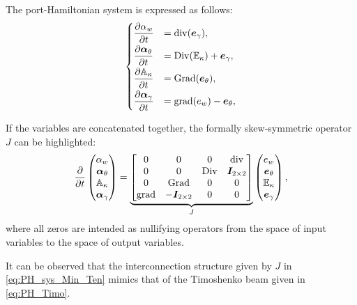 The port-Hamiltonian system is expressed as follows:
\begin{equation}
\begin{cases}
\displaystyle\diffp{\alpha_w}{t} &= \mathrm{div}(\bm{e}_{\gamma}), \vspace{1mm} \\
\displaystyle\diffp{\bm\alpha_\theta}{t} &= \mathrm{Div}( \mathbb{E}_{\kappa}) + \bm{e}_{\gamma}, \vspace{1mm} \\
\displaystyle\diffp{\mathbb{A}_\kappa}{t} &= \mathrm{Grad}(\bm{e}_{\theta}), \vspace{1mm} \\
\displaystyle\diffp{ \bm\alpha_{\gamma} }{t} &= \mathrm{grad}(e_w) - \bm{e}_{\theta},
\end{cases}
\end{equation}

If the variables are concatenated together, the formally skew-symmetric operator $J$ can be highlighted:
\begin{equation}
\label{eq:PH_sys_Min_Ten}
\diffp{}{t}
\begin{pmatrix}
\alpha_w \\
\bm\alpha_\theta \\
\mathbb{A}_\kappa \\
\bm\alpha_{\gamma} \\
\end{pmatrix} = 
\underbrace{\begin{bmatrix}
	0  & 0  & 0  & \mathrm{div} \\
	0 & 0 &  \mathrm{Div} & \bm{I}_{2 \times 2}\\
	0  & \mathrm{Grad}  & 0  & 0\\
	\mathrm{grad} & -\bm{I}_{2 \times 2} &  0 & 0  \\
	\end{bmatrix}}_{J}
\begin{pmatrix}
e_w \\
\bm{e}_{\theta} \\
\mathbb{E}_{\kappa} \\
\bm{e}_{\gamma} \\
\end{pmatrix},
\end{equation}
where all zeros are intended as nullifying operators from the space of input variables to the space of output variables.
\begin{remark}
	It can be observed that the interconnection structure given by $J$ in \eqref{eq:PH_sys_Min_Ten} mimics that of the Timoshenko beam given in \eqref{eq:PH_Timo}.
\end{remark}

